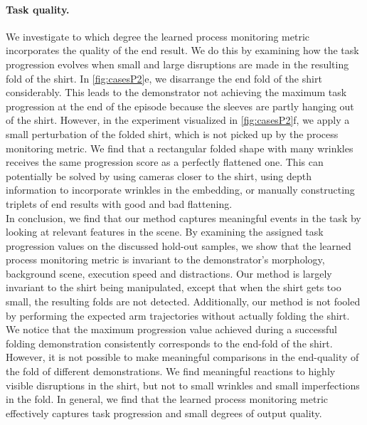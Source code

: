 \documentclass[\home/main.tex]{subfiles}
\begin{document}
\paragraph{Task quality.}
We investigate to which degree the learned process monitoring metric incorporates the quality of the end result. We do this by examining how the task progression evolves when small and large disruptions are made in the resulting fold of the shirt. In \cref{fig:casesP2}e, we disarrange the end fold of the shirt considerably. This leads to the demonstrator not achieving the maximum task progression at the end of the episode because the sleeves are partly hanging out of the shirt. However, in the experiment visualized in \cref{fig:casesP2}f, we apply a small perturbation of the folded shirt, which is not picked up by the process monitoring metric. We find that a rectangular folded shape with many wrinkles receives the same progression score as a perfectly flattened one. This can potentially be solved by using cameras closer to the shirt, using depth information to incorporate wrinkles in the embedding, or manually constructing triplets of end results with good and bad flattening. \\

In conclusion, we find that our method captures meaningful events in the task by looking at relevant features in the scene. By examining the assigned task progression values on the discussed hold-out samples, we show that the learned process monitoring metric is invariant to the demonstrator's morphology, background scene, execution speed and distractions. Our method is largely invariant to the shirt being manipulated, except that when the shirt gets too small, the resulting folds are not detected. Additionally, our method is not fooled by performing the expected arm trajectories without actually folding the shirt. We notice that the maximum progression value achieved during a successful folding demonstration consistently corresponds to the end-fold of the shirt. However, it is not possible to make meaningful comparisons in the end-quality of the fold of different demonstrations. We find meaningful reactions to highly visible disruptions in the shirt, but not to small wrinkles and small imperfections in the fold. In general, we find that the learned process monitoring metric effectively captures task progression and small degrees of output quality.

%
%
\end{document}
